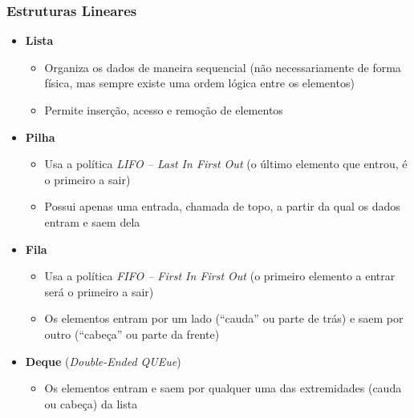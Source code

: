\documentclass[aspectratio=169]{beamer}
\begin{document}
\begin{frame}\frametitle{Estruturas Lineares}
\begin{itemize}
	\item \textbf{Lista}
	\begin{itemize}
		\item Organiza os dados de maneira sequencial (não necessariamente de forma física, mas sempre existe uma ordem lógica entre os elementos)
		\item Permite inserção, acesso e remoção de elementos
	\end{itemize}
	\item \textbf{Pilha}
	\begin{itemize}
		\item Usa a política \emph{LIFO -- Last In First Out} (o último elemento que entrou, é o primeiro a sair)
		\item Possui apenas uma entrada, chamada de topo, a partir da qual os dados entram e saem dela
	\end{itemize}
	\item \textbf{Fila}
	\begin{itemize}
		\item Usa a política \emph{FIFO -- First In First Out} (o primeiro elemento a entrar será o primeiro a sair)
		\item Os elementos entram por um lado (``cauda'' ou parte de trás) e saem por outro (``cabeça'' ou parte da frente)
	\end{itemize}
	\item \textbf{Deque} (\emph{Double-Ended QUEue})
	\begin{itemize}
		\item Os elementos entram e saem por qualquer uma das extremidades (cauda ou cabeça) da lista
	\end{itemize}
\end{itemize}
\end{frame}
\end{document}

